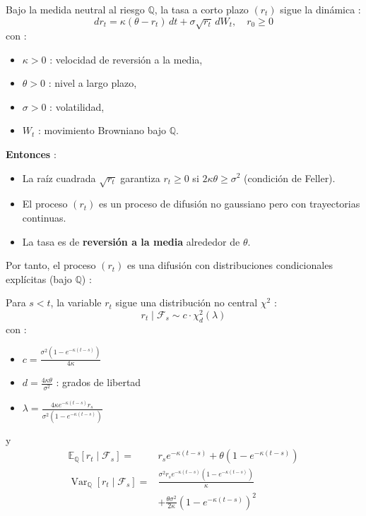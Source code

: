 \begin{f}
	
Bajo la medida neutral al riesgo \(\mathbb{Q}\), la tasa a corto plazo \((r_t)\) sigue la dinámica :
\[
dr_t = \kappa(\theta - r_t)\,dt + \sigma \sqrt{r_t}\, dW_t, \quad r_0 \geq 0
\]
con :
\begin{itemize}[nosep]
	\item \(\kappa > 0\) : velocidad de reversión a la media,
	\item \(\theta > 0\) : nivel a largo plazo,
	\item \(\sigma > 0\) : volatilidad,
	\item \(W_t\) : movimiento Browniano bajo \(\mathbb{Q}\).
\end{itemize}

\textbf{Entonces} :
\begin{itemize}
	\item La raíz cuadrada \(\sqrt{r_t}\) garantiza \(r_t \geq 0\) si \(2\kappa\theta \geq \sigma^2\) (condición de Feller).
	\item El proceso \((r_t)\) es un proceso de difusión no gaussiano pero con trayectorias continuas.
	\item La tasa es de \textbf{reversión a la media} alrededor de \(\theta\).
\end{itemize}

Por tanto, el proceso \((r_t)\) es una difusión con distribuciones condicionales explícitas (bajo \(\mathbb{Q}\)) :

Para \(s < t\), la variable \(r_t\) sigue una distribución no central \(\chi^2\) :
\[
r_t \mid \mathcal{F}_s \sim c \cdot \chi^2_{d}(\lambda)
\]
con :
\begin{itemize}[nosep]
	\item \(\displaystyle c = \frac{\sigma^2 (1 - e^{-\kappa (t - s)})}{4\kappa}\)
	\item \(\displaystyle d = \frac{4\kappa\theta}{\sigma^2}\) : grados de libertad
	\item \(\displaystyle \lambda = \frac{4\kappa e^{-\kappa (t - s)} r_s}{\sigma^2 (1 - e^{-\kappa (t - s)})}\)
\end{itemize}

y
\[
\begin{aligned}
	\mathbb{E}_\mathbb{Q}[r_t \mid \mathcal{F}_s] =& r_s e^{-\kappa(t-s)} + \theta (1 - e^{-\kappa(t-s)}) \\
	\operatorname{Var}_\mathbb{Q}[r_t \mid \mathcal{F}_s] =& \frac{\sigma^2 r_s e^{-\kappa(t-s)} (1 - e^{-\kappa(t-s)})}{\kappa} \\
			&+ \frac{\theta \sigma^2}{2\kappa} (1 - e^{-\kappa(t-s)})^2
\end{aligned}
\]

\end{f}
